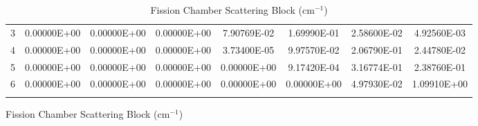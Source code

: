 \begin{figure}
\begin{table}[H]
\begin{subtable}[h]{1.0\textwidth}
{\begin{tabular}{*8c}
3 &	0.00000E+00 &	0.00000E+00 &	0.00000E+00 &	7.90769E-02 &	1.69990E-01 &	2.58600E-02 &	4.92560E-03 \\
4 &	0.00000E+00 &	0.00000E+00 &	0.00000E+00 &	3.73400E-05 &	9.97570E-02 &	2.06790E-01 &	2.44780E-02 \\
5 &	0.00000E+00 &	0.00000E+00 &	0.00000E+00 &	0.00000E+00 &	9.17420E-04 &	3.16774E-01 &	2.38760E-01 \\
6 &	0.00000E+00 &	0.00000E+00 &	0.00000E+00 &	0.00000E+00 &	0.00000E+00 &	4.97930E-02 &	1.09910E+00 \\
        \bottomrule
        & & & & & & & 
    \end{tabular}}
        \caption{Fission Chamber Scattering Block (cm$^{-1}$)}
  \end{subtable}
\end{table}
\end{figure}

